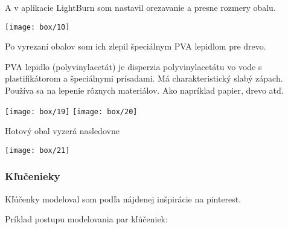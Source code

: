         A v aplikacie LightBurn som nastavil orezavanie a presne rozmery obalu.

        \begin{center}
          \texttt{[image: box/10]}
        \end{center}

        Po vyrezaní obalov som ich zlepil špeciálnym PVA lepidlom pre drevo.

        PVA lepidlo (polyvinylacetát) je disperzia polyvinylacetátu vo vode s plastifikátorom a špeciálnymi prísadami. Má charakteristický slabý zápach. Používa sa na lepenie rôznych materiálov. Ako napríklad papier, drevo atď.

        \begin{center}
          \texttt{[image: box/19]}
          \vfill{}
          \texttt{[image: box/20]}
        \end{center}

        Hotový obal vyzerá nasledovne

        \begin{center}
          \texttt{[image: box/21]}
        \end{center}
      \subsubsection{Kľučenieky}

      Kľúčenky modeloval som podľa nájdenej inšpirácie na pinterest.

      Príklad postupu modelovania par kľúčeniek:

